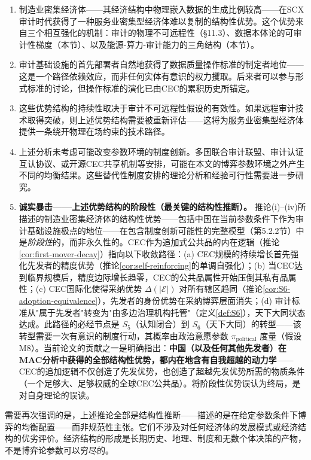 \documentclass[12pt,a4paper]{ctexart}
\theoremstyle{definition}
\theoremstyle{remark}
\begin{document}
\begin{enumerate}[label=(\roman*)]
    \item 制造业密集经济体——其经济结构中物理嵌入数据的生成比例较高——在SCX审计时代获得了一种服务业密集型经济体难以复制的结构性优势。这个优势来自三个相互强化的机制：审计的物理不可远程性（§11.3）、数据本体论的可审计性梯度（本节）、以及能源-算力-审计能力的三角结构（本节）。
    \item 审计基础设施的首先部署者自然地获得了数据质量操作标准的制定者地位——这是一个路径依赖效应，而非任何实体有意识的权力攫取。后来者可以参与形式标准的讨论，但操作标准的演化已由CEC的累积历史所锚定。
    \item 这些优势结构的持续性取决于审计不可远程性假设的有效性。如果远程审计技术取得突破，则上述优势结构需要被重新评估——这将为服务业密集型经济体提供一条绕开物理在场约束的技术路径。
    \item 上述分析未考虑可能改变参数环境的制度创新。多国联合审计联盟、审计认证互认协议、或开源CEC共享机制等安排，可能在本文的博弈参数环境之外产生不同的均衡结果。这些替代性制度安排的理论分析和经验可行性需要进一步研究。
    \item \textbf{诚实暴击——上述优势结构的阶段性（最关键的结构性推断）。} 推论(i)--(iv)所描述的制造业密集经济体的结构性优势——包括中国在当前参数条件下作为审计基础设施极点的地位——在包含制度创新可能性的完整模型（第5.2.2节）中是\textit{阶段性}的，而非永久性的。CEC作为追加式公共品的内在逻辑（推论\ref{cor:first-mover-decay}）指向以下收敛路径：(a) CEC规模的持续增长首先强化先发者的精度优势（推论\ref{cor:self-reinforcing}的单调自强化）；(b) 当CEC达到临界规模后，精度边际增长趋零，CEC的公共品属性开始压倒其私有品属性；(c) CEC国际化使得采纳优势 $\Delta(|\mathcal{E}|)$ 对所有辖区趋同（推论\ref{cor:S6-adoption-equivalence}），先发者的身份优势在采纳博弈层面消失；(d) 审计标准从"属于先发者"转变为"由多边治理机构托管"（定义\ref{def:S6}），天下大同状态达成。此路径的必经节点是 $S_5$（认知闭合）到 $S_6$（天下大同）的转型——该转型需要一次有意识的制度行动，其概率由政治意愿参数 $\pi_{\text{political}}$ 度量（假设M8）。当前论文的贡献之一是明确指出：\textbf{中国（以及任何其他先发者）在MAC分析中获得的全部结构性优势，都内在地含有自我超越的动力学}——CEC的追加逻辑不仅创造了先发优势，也创造了超越先发优势所需的物质条件（一个足够大、足够权威的全球CEC公共品）。将阶段性优势误认为终局，是对自身理论的误读。
\end{enumerate}

需要再次强调的是，上述推论全部是结构性推断——描述的是在给定参数条件下博弈的均衡配置——而非规范性主张。它们不涉及对任何经济体的发展模式或经济结构的优劣评价。经济结构的形成是长期历史、地理、制度和无数个体决策的产物，不是博弈论参数可以穷尽的。
\end{document}

